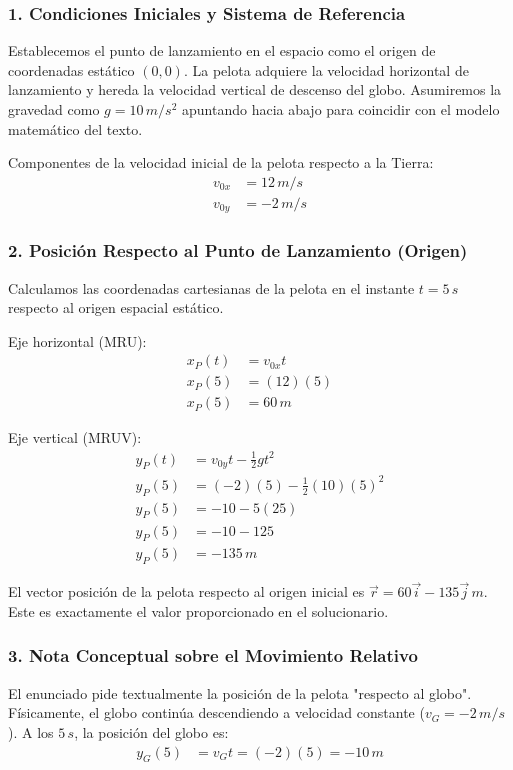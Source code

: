 \documentclass[12pt, a4paper]{article}
\begin{document}
\subsubsection*{1. Condiciones Iniciales y Sistema de Referencia}
Establecemos el punto de lanzamiento en el espacio como el origen de coordenadas estático $(0,0)$. 
La pelota adquiere la velocidad horizontal de lanzamiento y hereda la velocidad vertical de descenso del globo. Asumiremos la gravedad como $g = 10 \, \si{m/s^2}$ apuntando hacia abajo para coincidir con el modelo matemático del texto.

Componentes de la velocidad inicial de la pelota respecto a la Tierra:
\begin{align*}
v_{0x} &= 12 \, \si{m/s} \\
v_{0y} &= -2 \, \si{m/s}
\end{align*}

\subsubsection*{2. Posición Respecto al Punto de Lanzamiento (Origen)}
Calculamos las coordenadas cartesianas de la pelota en el instante $t = 5 \, \si{s}$ respecto al origen espacial estático.

Eje horizontal (MRU):
\begin{align*}
x_P(t) &= v_{0x} t \\
x_P(5) &= (12)(5) \\
x_P(5) &= 60 \, \si{m}
\end{align*}

Eje vertical (MRUV):
\begin{align*}
y_P(t) &= v_{0y} t - \frac{1}{2} g t^2 \\
y_P(5) &= (-2)(5) - \frac{1}{2}(10)(5)^2 \\
y_P(5) &= -10 - 5(25) \\
y_P(5) &= -10 - 125 \\
y_P(5) &= -135 \, \si{m}
\end{align*}

El vector posición de la pelota respecto al origen inicial es $\vec{r} = 60\vec{i} - 135\vec{j} \, \si{m}$. Este es exactamente el valor proporcionado en el solucionario.

\subsubsection*{3. Nota Conceptual sobre el Movimiento Relativo}
El enunciado pide textualmente la posición de la pelota "respecto al globo". Físicamente, el globo continúa descendiendo a velocidad constante ($v_G = -2 \, \si{m/s}$). A los $5 \, \si{s}$, la posición del globo es:
\begin{align*}
y_G(5) &= v_G t = (-2)(5) = -10 \, \si{m}
\end{align*}
\end{document}
